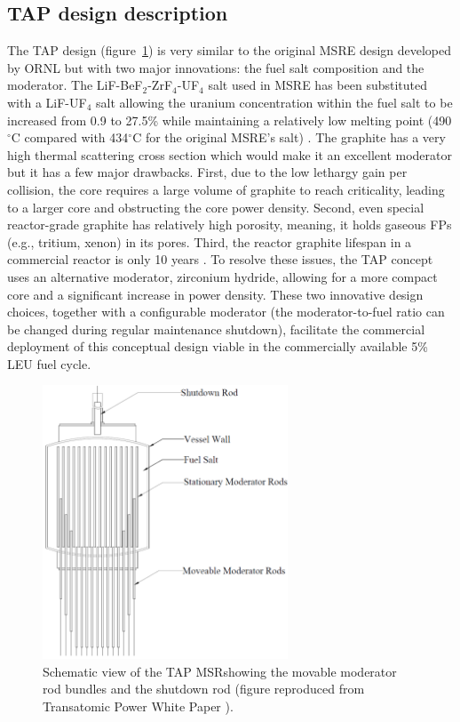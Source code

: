 \documentclass[12pt]{article} %
\begin{document}
\subsection{TAP design description}
The \gls{TAP} design (figure~\ref{fig:tap-main-view}) is very similar to the  
original \gls{MSRE} design developed by \gls{ORNL} 
\cite{haubenreich_experience_1970} but with two major innovations: 
the fuel salt composition and the moderator. The LiF-BeF$_2$-ZrF$_4$-UF$_4$ 
salt used in \gls{MSRE} has been substituted with a LiF-UF$_4$ salt allowing  
the uranium concentration within the fuel salt to be increased from 0.9 to 
27.5\% while maintaining a relatively low melting point (490$^{\circ}$C 
compared with 434$^{\circ}$C for the original \gls{MSRE}'s salt) 
\cite{betzler_two-dimensional_2016}. The graphite has a very high 
thermal scattering cross section which would make it an excellent moderator 
but it has a few major drawbacks. First, due to the low lethargy gain per 
collision, the core requires a large volume of graphite to reach criticality,  
leading to a larger core and obstructing the core power density. Second, even 
special reactor-grade graphite has relatively high porosity, meaning, it holds
gaseous \glspl{FP} (e.g., tritium, xenon) in its pores. Third, the reactor 
graphite lifespan in a commercial reactor is only 10 years 
\cite{robertson_conceptual_1971}. To resolve these issues, the \gls{TAP} 
concept uses an alternative moderator, zirconium hydride, allowing for 
a more compact core and a significant increase in power density. These two 
innovative design choices, together with a configurable moderator 
(the moderator-to-fuel ratio can be changed during regular maintenance 
shutdown), facilitate the commercial deployment of this conceptual design 
viable in the commercially available 5\% \gls{LEU} fuel cycle. 
\begin{figure}[htp!] %
  		\hspace{+1.6in}
		  \includegraphics[width=0.65\textwidth]{tap_front_view.png}
  \caption{Schematic view of the \gls{TAP} \gls{MSR}showing the movable 
  moderator rod bundles and the shutdown rod (figure reproduced from 
  Transatomic Power White Paper 
  \cite{transatomic_power_corporation_technical_2016}).}
  \label{fig:tap-main-view}
\end{figure}
\end{document}
